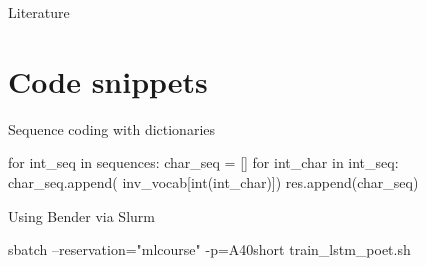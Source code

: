 \documentclass{beamer}
\begin{document}
    \begin{frame}[allowframebreaks]{Literature}
      \printbibliography
    \end{frame}

    \section{Code snippets}
    \begin{frame}[fragile]{Sequence coding with dictionaries}
    \begin{python}
      for int_seq in sequences:
      char_seq = []
      for int_char in int_seq:
          char_seq.append(
            inv_vocab[int(int_char)])
      res.append(char_seq)
    \end{python}
    \end{frame}

    \begin{frame}[fragile]{Using Bender via Slurm}
      \begin{python}
  sbatch --reservation="mlcourse"
         -p=A40short
         train_lstm_poet.sh
      \end{python}
    \end{frame}
\end{document}
